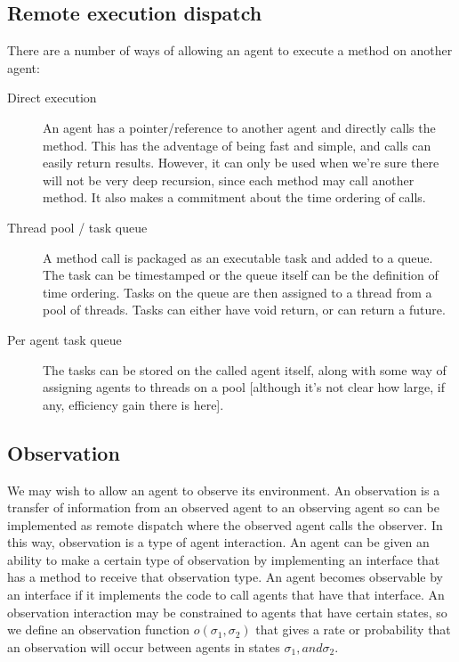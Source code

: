 \documentclass[a4paper]{article}
\begin{document}
\subsection{Remote execution dispatch}

There are a number of ways of allowing an agent to execute a method on another agent:
\begin{description}

\item[Direct execution] An agent has a pointer/reference to another agent and directly calls the method. This has the adventage of being fast and simple, and calls can easily return results. However, it can only be used when we're sure there will not be very deep recursion, since each method may call another method. It also makes a commitment about the time ordering of calls.

\item[Thread pool / task queue] A method call is packaged as an executable task and added to a queue. The task can be timestamped or the queue itself can be the definition of time ordering. Tasks on the queue are then assigned to a thread from a pool of threads. Tasks can either have void return, or can return a future. 

\item[Per agent task queue] The tasks can be stored on the called agent itself, along with some way of assigning agents to threads on a pool [although it's not clear how large, if any, efficiency gain there is here].

\end{description}

\subsection{Observation}

We may wish to allow an agent to observe its environment. An observation is a transfer of information from an observed agent to an observing agent so can be implemented as remote dispatch where the observed agent calls the observer. In this way, observation is a type of agent interaction. An agent can be given an ability to make a certain type of observation by implementing an interface that has a method to receive that observation type. An agent becomes observable by an interface if it implements the code to call agents that have that interface. An observation interaction may be constrained to agents that have certain states, so we define an observation function $o(\sigma_1, \sigma_2)$ that gives a rate or probability that an observation will occur between agents in states $\sigma_1, and \sigma_2$.
\end{document}
